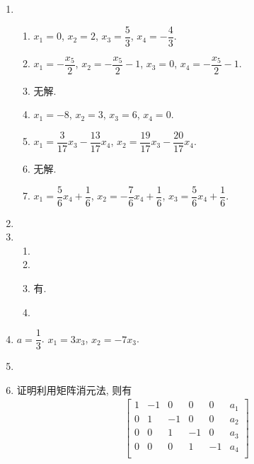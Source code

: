 \documentclass[a4paper, 11pt]{ctexart}
\begin{document}
    \begin{enumerate}
        \item %
            \begin{enumerate}[(1)]
                \item %
                    $x_1 = 0$, $x_2 = 2$, $x_3 = \dfrac53$, $x_4 = -\dfrac43$.
                \item %
                    $x_1 = -\dfrac{x_5}{2}$, $x_2 = -\dfrac{x_5}{2} - 1$, $x_3 = 0$, $x_4 = -\dfrac{x_5}{2} - 1$.
                \item %
                    无解.
                \item %
                    $x_1 = -8$, $x_2 = 3$, $x_3 = 6$, $x_4 = 0$.
                \item %
                    $x_1 = \dfrac{3}{17}x_3 - \dfrac{13}{17}x_4$, $x_2 = \dfrac{19}{17}x_3 - \dfrac{20}{17}x_4$.
                \item %
                    无解.
                \item %
                    $x_1 = \dfrac56x_4 + \dfrac16$, $x_2 = -\dfrac76x_4 + \dfrac16$, $x_3 = \dfrac56x_4 + \dfrac16$.
            \end{enumerate}
        \item %
        \item %
            \begin{enumerate}[(1)]
                \item %
                \item %
                \item %
                    有.
                \item %
            \end{enumerate}
        \item %
            $a = \dfrac13$. $x_1 = 3x_3$, $x_2 = -7x_3$.
        \item %
        \item %
            {\heiti 证明}\quad 利用矩阵消元法, 则有
            \begin{gather*}
                \begin{bmatrix}
                    1 & -1 & 0 & 0 & 0 & a_1 \\
                    0 & 1 & -1 & 0 & 0 & a_2 \\
                    0 & 0 & 1 & -1 & 0 & a_3 \\ 
                    0 & 0 & 0 & 1 & -1 & a_4 \\

\end{bmatrix}
\end{gather*}
\end{enumerate}
\end{document}
